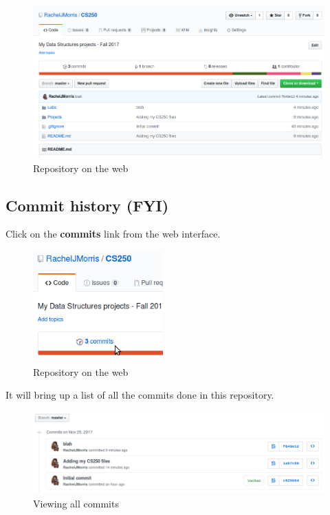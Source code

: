 \documentclass[a4paper,12pt,oneside]{book}
\begin{document}
        \begin{figure}[h]
            \centering
            \includegraphics[width=14cm]{images/github-webrepo.png}
            \caption{Repository on the web}
        \end{figure}

        \subsection{Commit history (FYI)}

        Click on the \textbf{commits} link from the web interface.

        \begin{figure}[h]
            \centering
            \includegraphics[width=5cm]{images/github-commits.png}
            \caption{Repository on the web}
        \end{figure}
        
        It will bring up a list of all the commits done in this repository.

        \begin{figure}[h]
            \centering
            \includegraphics[width=14cm]{images/github-commits2.png}
            \caption{Viewing all commits}
        \end{figure}
\end{document}
